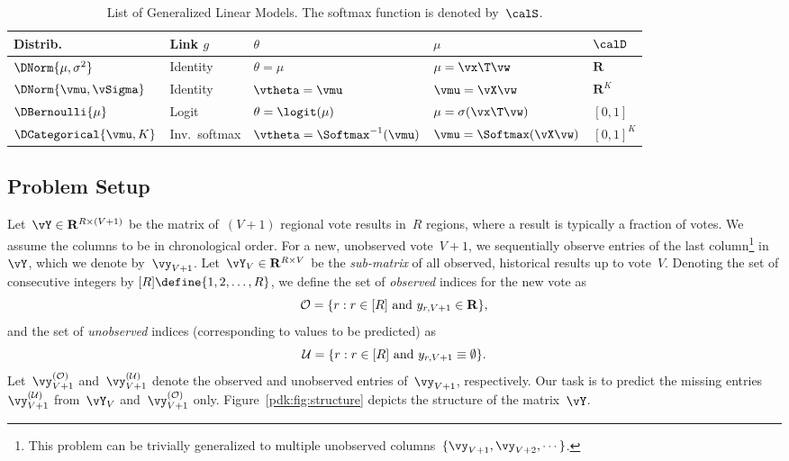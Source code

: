 \begin{table}
	\centering
	\caption{
		List of Generalized Linear Models.
		The softmax function is denoted by~$\calS$.
	}
	\label{pdk:tab:glm}
	\begin{tabular}{lllll}
		\toprule
		Distrib.                 & Link $g$      & $\theta$                        & $\mu$                      & $\calD$        \\
		\midrule

		$\DNorm{\mu, \sigma^2}$  & Identity      & $\theta = \mu$                  & $\mu = \vx\T \vw$          & $\mathbf{R}$   \\
		$\DNorm{\vmu, \vSigma}$  & Identity      & $\vtheta = \vmu$                & $\vmu = \vX \vw$           & $\mathbf{R}^K$ \\
		$\DBernoulli{\mu}$       & Logit         & $\theta = \logit(\mu)$          & $\mu = \sigma(\vx\T \vw)$  & $[0, 1]$       \\
		$\DCategorical{\vmu, K}$ & Inv.\ softmax & $\vtheta = \Softmax^{-1}(\vmu)$ & $\vmu = \Softmax(\vX \vw)$ & $[0, 1]^K$     \\

		\bottomrule
	\end{tabular}
\end{table}

\subsection{Problem Setup}

Let~$\vY \in \mathbf{R}^{R \times (V+1)}$ be the matrix of~$(V+1)$ regional vote results in~$R$ regions, where a result is typically a fraction of votes.
We assume the columns to be in chronological order.
For a new, unobserved vote~$V+1$, we sequentially observe entries of the last column\footnote{This problem can be trivially generalized to multiple unobserved columns~$\{\vy_{V+1}, \vy_{V+2}, \cdots \}$.} in~$\vY$, which we denote by~$\vy_{V+1}$.
Let~$\vY_V \in \mathbf{R}^{R \times V}$ be the \emph{sub-matrix} of all observed, historical results up to vote~$V$.
Denoting the set of consecutive integers by $[R] \define \{1, 2, \ldots, R \}$, we define the set of \textit{observed} indices for the new vote as
\begin{equation*}
	\mathcal{O} = \{ r : r \in [R] \text{ and } y_{r,V+1} \in \mathbf{R} \},
\end{equation*}
and the set of \textit{unobserved} indices (corresponding to values to be predicted) as
\begin{equation*}
	\mathcal{U} = \{ r : r \in [R] \text{ and } y_{r,V+1} \equiv \emptyset \}.
\end{equation*}
Let~$\vy^{(\Obs)}_{V+1}$ and~$\vy^{(\Ubs)}_{V+1}$ denote the observed and unobserved entries of~$\vy_{V+1}$, respectively.
Our task is to predict the missing entries~$\vy^{(\Ubs)}_{V+1}$ from~$\vY_V$ and~$\vy^{(\Obs)}_{V+1}$ only.
Figure~\ref{pdk:fig:structure} depicts the structure of the matrix~$\vY$.

